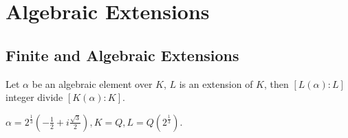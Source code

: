 \chapter{Algebraic Extensions}
\section{Finite and Algebraic Extensions}
\begin{exam}[Counterexample]
  Let $\alpha$ be an algebraic element over $K$, $L$ is an extension of $K$, then $[L(\alpha):L]$ integer divide $[K(\alpha):K]$.

  $\alpha=2^{\frac{1}{3}}(-\frac{1}{2}+i\frac{\sqrt 3}{2}), K=Q, L=Q(2^{\frac{1}{3}})$.
\end{exam}


